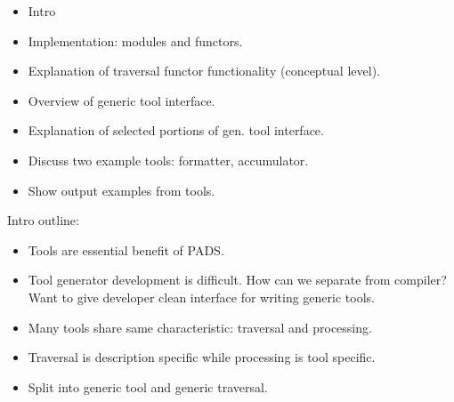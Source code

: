 \begin{itemize}
\item Intro
\item Implementation: modules and functors.
\item Explanation of traversal functor functionality (conceptual level).
\item Overview of generic tool interface.
\item Explanation of selected portions of gen. tool interface.
\item Discuss two example tools: formatter, accumulator.
\item Show output examples from tools.
\end{itemize}

Intro outline:
\begin{itemize}
\item Tools are essential benefit of PADS.
\item Tool generator development is difficult. How can we separate
  from compiler? Want to give developer clean interface for writing
  generic tools.
\item Many tools share same characteristic: traversal and processing.
\item Traversal is description specific while processing is tool specific.
\item Split into generic tool and generic traversal.
\end{itemize}

